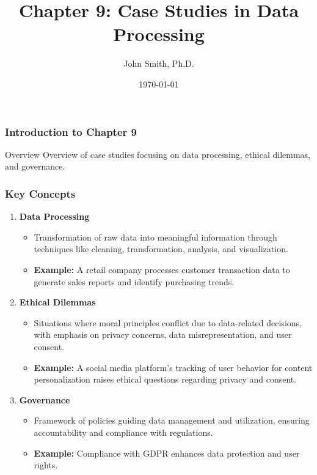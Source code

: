 \documentclass[aspectratio=169]{beamer}
\title[Chapter 9: Case Studies in Data Processing]{Chapter 9: Case Studies in Data Processing}
\author[J. Smith]{John Smith, Ph.D.}
\institute[University Name]{
  Department of Computer Science\\
  University Name\\
  \vspace{0.3cm}
  Email: email@university.edu\\
  Website: www.university.edu
}
\date{\today}
\begin{document}
\frame{\titlepage}

\begin{frame}[fragile]
    \frametitle{Introduction to Chapter 9}
    \begin{block}{Overview}
        Overview of case studies focusing on data processing, ethical dilemmas, and governance.
    \end{block}
\end{frame}

\begin{frame}[fragile]
    \frametitle{Key Concepts}
    \begin{enumerate}
        \item \textbf{Data Processing}  
        \begin{itemize}
            \item Transformation of raw data into meaningful information through techniques like cleaning, transformation, analysis, and visualization.
            \item \textbf{Example:} A retail company processes customer transaction data to generate sales reports and identify purchasing trends.
        \end{itemize}

        \item \textbf{Ethical Dilemmas}  
        \begin{itemize}
            \item Situations where moral principles conflict due to data-related decisions, with emphasis on privacy concerns, data misrepresentation, and user consent.
            \item \textbf{Example:} A social media platform's tracking of user behavior for content personalization raises ethical questions regarding privacy and consent.
        \end{itemize}

        \item \textbf{Governance}  
        \begin{itemize}
            \item Framework of policies guiding data management and utilization, ensuring accountability and compliance with regulations.
            \item \textbf{Example:} Compliance with GDPR enhances data protection and user rights.
        \end{itemize}
    \end{enumerate}
\end{frame}
\end{document}
